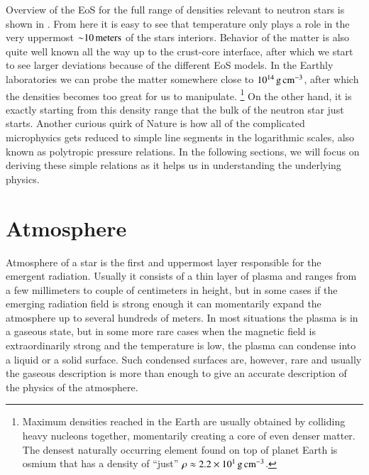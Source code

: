 Overview of the EoS for the full range of densities relevant to neutron stars is shown in .
From here it is easy to see that temperature only plays a role in the very uppermost $\mathord{\sim} 10\,\mathrm{meters}$ of the stars interiors.
Behavior of the matter is also quite well known all the way up to the crust-core interface, after which we start to see larger deviations because of the different EoS models.
In the Earthly laboratories we can probe the matter somewhere close to $10^{14} \, \mathrm{g}\,\mathrm{cm}^{-3}$, after which the densities becomes too great for us to manipulate.%
\footnote{Maximum densities reached in the Earth are usually obtained by colliding heavy nucleons together, momentarily creating a core of even denser matter.
The densest naturally occurring element found on top of planet Earth is osmium that has a density of ``just'' $\rho \approx 2.2 \times 10^{1}\, \mathrm{g}\,\mathrm{cm}^{-3}$.
}
On the other hand, it is exactly starting from this density range that the bulk of the neutron star just starts.
Another curious quirk of Nature is how all of the complicated microphysics gets reduced to simple line segments in the logarithmic scales, also known as polytropic pressure relations.
In the following sections, we will focus on deriving these simple relations as it helps us in understanding the underlying physics.

\section{Atmosphere}\label{sect:atmos}

Atmosphere of a star is the first and uppermost layer responsible for the emergent radiation.
Usually it consists of a thin layer of plasma and ranges from a few millimeters to couple of centimeters in height, but in some cases if the emerging radiation field is strong enough it can momentarily expand the atmosphere up to several hundreds of meters.
In most situations the plasma is in a gaseous state, but in some more rare cases when the magnetic field is extraordinarily strong and the temperature is low, the plasma can condense into a liquid or a solid surface.
Such condensed surfaces are, however, rare and usually the gaseous description is more than enough to give an accurate description of the physics of the atmosphere.\cite[see e.g.,][for a review]{ZP02, Potekhin14}

